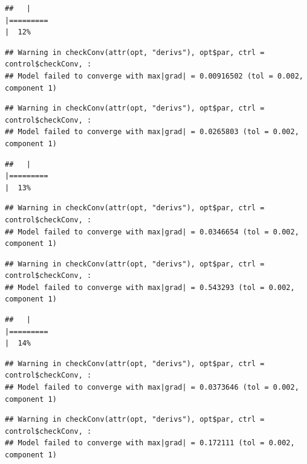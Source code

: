 \documentclass[
  12pt,
]{book}
\begin{document}
\begin{verbatim}
##   |                                                                              |=========                                                             |  12%
\end{verbatim}

\begin{verbatim}
## Warning in checkConv(attr(opt, "derivs"), opt$par, ctrl = control$checkConv, :
## Model failed to converge with max|grad| = 0.00916502 (tol = 0.002, component 1)
\end{verbatim}

\begin{verbatim}
## Warning in checkConv(attr(opt, "derivs"), opt$par, ctrl = control$checkConv, :
## Model failed to converge with max|grad| = 0.0265803 (tol = 0.002, component 1)
\end{verbatim}

\begin{verbatim}
##   |                                                                              |=========                                                             |  13%
\end{verbatim}

\begin{verbatim}
## Warning in checkConv(attr(opt, "derivs"), opt$par, ctrl = control$checkConv, :
## Model failed to converge with max|grad| = 0.0346654 (tol = 0.002, component 1)
\end{verbatim}

\begin{verbatim}
## Warning in checkConv(attr(opt, "derivs"), opt$par, ctrl = control$checkConv, :
## Model failed to converge with max|grad| = 0.543293 (tol = 0.002, component 1)
\end{verbatim}

\begin{verbatim}
##   |                                                                              |=========                                                             |  14%
\end{verbatim}

\begin{verbatim}
## Warning in checkConv(attr(opt, "derivs"), opt$par, ctrl = control$checkConv, :
## Model failed to converge with max|grad| = 0.0373646 (tol = 0.002, component 1)
\end{verbatim}

\begin{verbatim}
## Warning in checkConv(attr(opt, "derivs"), opt$par, ctrl = control$checkConv, :
## Model failed to converge with max|grad| = 0.172111 (tol = 0.002, component 1)
\end{verbatim}
\end{document}

